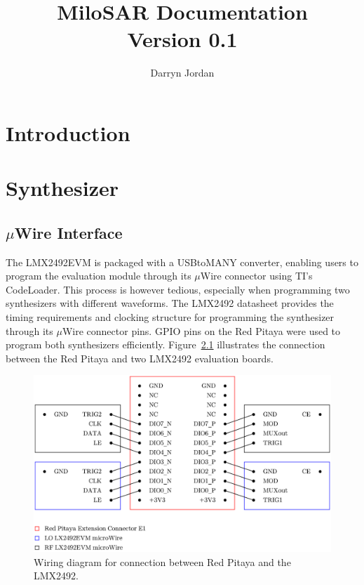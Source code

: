 \documentclass[a4paper,11pt]{report}
\title{MiloSAR Documentation \\ \vspace{0.5cm} \Large Version 0.1}
\author{Darryn Jordan}
\begin{document}
\maketitle
\tableofcontents

\chapter{Introduction}

\chapter{Synthesizer}

\section{$ \mu $Wire Interface}

The LMX2492EVM is packaged with a USBtoMANY converter, enabling users to program the evaluation module through its $ \mu $Wire connector using TI's CodeLoader. This process is however tedious, especially when programming two synthesizers with different waveforms. The LMX2492 datasheet provides the timing requirements and clocking structure for programming the synthesizer through its $ \mu $Wire connector pins. GPIO pins on the Red Pitaya were used to program both synthesizers efficiently. Figure~\ref{fig_rp_synth_connect} illustrates the connection between the Red Pitaya and two LMX2492 evaluation boards.
\begin{figure}[h!]
    \begin{center}
        \includegraphics[width=\textwidth]{images/rp_synth_connections.pdf}
        \caption{Wiring diagram for connection between Red Pitaya and the LMX2492.}
        \label{fig_rp_synth_connect}
    \end{center}
\end{figure}
\end{document}
